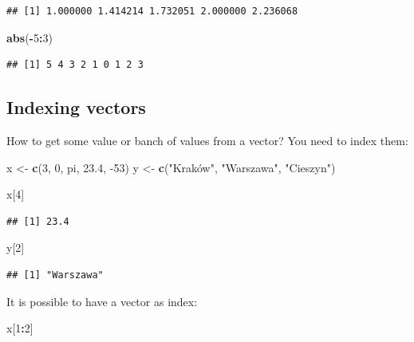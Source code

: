 \documentclass[
]{book}
\newenvironment{Shaded}{\begin{snugshade}}{\end{snugshade}}
\newcommand{\DecValTok}[1]{\textcolor[rgb]{0.00,0.00,0.81}{#1}}
\newcommand{\FloatTok}[1]{\textcolor[rgb]{0.00,0.00,0.81}{#1}}
\newcommand{\KeywordTok}[1]{\textcolor[rgb]{0.13,0.29,0.53}{\textbf{#1}}}
\newcommand{\NormalTok}[1]{#1}
\newcommand{\OperatorTok}[1]{\textcolor[rgb]{0.81,0.36,0.00}{\textbf{#1}}}
\newcommand{\StringTok}[1]{\textcolor[rgb]{0.31,0.60,0.02}{#1}}
\begin{document}
\begin{verbatim}
## [1] 1.000000 1.414214 1.732051 2.000000 2.236068
\end{verbatim}

\begin{Shaded}
\begin{Highlighting}[]
\KeywordTok{abs}\NormalTok{(}\OperatorTok{-}\DecValTok{5}\OperatorTok{:}\DecValTok{3}\NormalTok{)}
\end{Highlighting}
\end{Shaded}

\begin{verbatim}
## [1] 5 4 3 2 1 0 1 2 3
\end{verbatim}

\hypertarget{indexing-vectors}{%
\subsection{Indexing vectors}\label{indexing-vectors}}

How to get some value or banch of values from a vector? You need to index them:

\begin{Shaded}
\begin{Highlighting}[]
\NormalTok{x <-}\StringTok{ }\KeywordTok{c}\NormalTok{(}\DecValTok{3}\NormalTok{, }\DecValTok{0}\NormalTok{, pi, }\FloatTok{23.4}\NormalTok{, }\DecValTok{-53}\NormalTok{)}
\NormalTok{y <-}\StringTok{ }\KeywordTok{c}\NormalTok{(}\StringTok{"Kraków", "}\NormalTok{Warszawa}\StringTok{", "}\NormalTok{Cieszyn}\StringTok{")}

\StringTok{x[4]}
\end{Highlighting}
\end{Shaded}

\begin{verbatim}
## [1] 23.4
\end{verbatim}

\begin{Shaded}
\begin{Highlighting}[]
\NormalTok{y[}\DecValTok{2}\NormalTok{]}
\end{Highlighting}
\end{Shaded}

\begin{verbatim}
## [1] "Warszawa"
\end{verbatim}

It is possible to have a vector as index:

\begin{Shaded}
\begin{Highlighting}[]
\NormalTok{x[}\DecValTok{1}\OperatorTok{:}\DecValTok{2}\NormalTok{]}
\end{Highlighting}
\end{Shaded}
\end{document}
